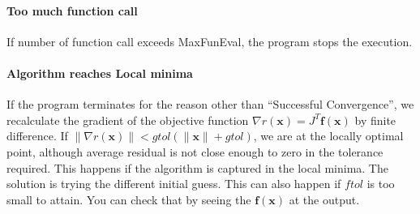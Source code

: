 \documentclass[12pt]{article}
\def\xb{{\mathbf{x}}}
\def\fb{{\mathbf{f}}}
\begin{document}
\paragraph{Too much function call}
If number of function call exceeds MaxFunEval, the program stops the execution. 

\paragraph{Algorithm reaches Local minima}
If the program terminates for the reason other than ``Successful Convergence'', we recalculate the
gradient of the objective function $\nabla r(\xb) = J^T\fb(\xb)$ by finite difference. If
$\|\nabla r(\xb)\| < gtol(\|\xb\|+gtol)$, we are at the locally optimal point, although average
residual is not close enough to zero in the tolerance required. This happens if the algorithm is
captured in the local minima. The solution is trying the different initial guess. This can also
happen if $ftol$ is too small to attain. You can check that by seeing the $\fb(\xb)$ at the
output.  
\end{document}

